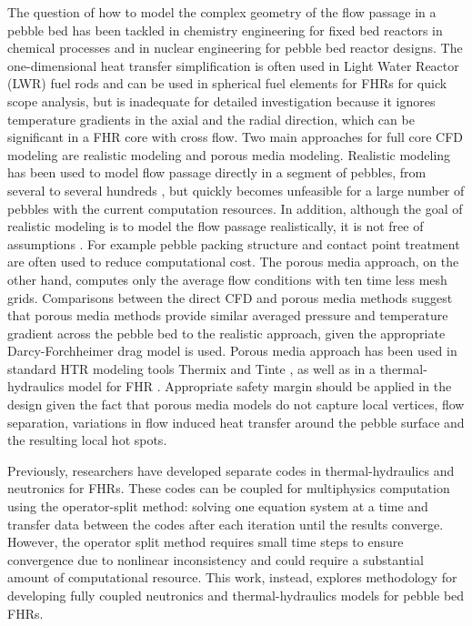 \documentclass{elsarticle}
\begin{document}
The question of how to model the complex geometry of the flow passage in a pebble bed has been tackled in chemistry engineering \cite{Dixon2001}\cite{Miroliaei2011} for fixed bed reactors in chemical processes and in nuclear engineering for pebble bed reactor designs.  The one-dimensional heat transfer simplification is often used in Light Water Reactor (LWR) fuel rods and can be used in spherical fuel elements for FHRs for quick scope analysis, but is inadequate for detailed investigation because it ignores temperature gradients in the axial and the radial direction, which can be significant in a FHR core with cross flow. Two main approaches for full core CFD modeling are realistic modeling and porous media modeling. Realistic modeling has been used to model flow passage directly in a segment of pebbles, from several to several hundreds \cite{Lee2007}\cite{Hassana}\cite{Shams2013}, but quickly becomes unfeasible for a large number of pebbles with the current computation resources. In addition, although the goal of realistic modeling is to model the flow passage realistically, it is not free of assumptions \cite{Lee2007}. For example pebble packing structure and contact point treatment are often used to reduce computational cost. The porous media approach, on the other hand, computes only the average flow conditions with ten time less mesh grids. Comparisons between the direct CFD and porous media methods\cite{Wu2010} suggest that porous media methods provide similar averaged pressure and temperature gradient across the pebble bed to the realistic approach, given the appropriate Darcy-Forchheimer drag model is used. Porous media approach has been used in standard HTR modeling tools Thermix \cite{Struth1985} and Tinte \cite{Gerwin1987}, as well as in a thermal-hydraulics model for FHR \cite{Scarlat2012}.
Appropriate safety margin should be applied in the design given the fact that porous media models do not capture local vertices, flow separation, variations in flow induced heat transfer around the pebble surface and the resulting local hot spots.

Previously, researchers have developed separate codes in thermal-hydraulics \cite{Scarlat2012} and neutronics \cite{Cisneros2013} for FHRs. These codes can be coupled for multiphysics computation using the operator-split method: solving one equation system at a time and transfer data between the codes after each iteration until the results converge. However, the operator split method requires small time steps to ensure convergence due to nonlinear inconsistency \cite{Ragusa2009} and could require a substantial amount of computational resource. This work, instead, explores methodology for developing fully coupled neutronics and thermal-hydraulics models for pebble bed FHRs.  
\end{document}
